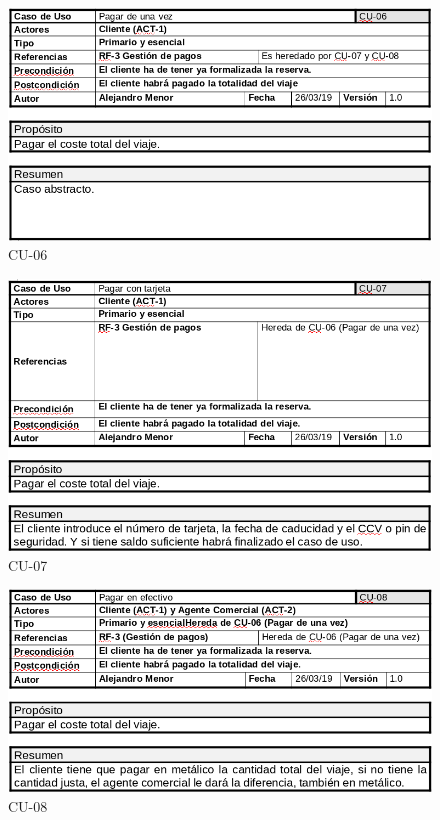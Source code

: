 \documentclass{article}
\begin{document}
	\begin{figure}[H]
		\centering
		\includegraphics[totalheight=7.5cm]{cu-06}
		\caption{CU-06}
		\label{fig:cu-06}
	\end{figure}

	\begin{figure}[H]
		\centering
		\includegraphics[totalheight=8.5cm]{cu-07}
		\caption{CU-07}
		\label{fig:cu-07}
	\end{figure}

	\begin{figure}[H]
		\centering
		\includegraphics[totalheight=7cm]{cu-08}
		\caption{CU-08}
		\label{fig:cu-08}
	\end{figure}
\end{document}
